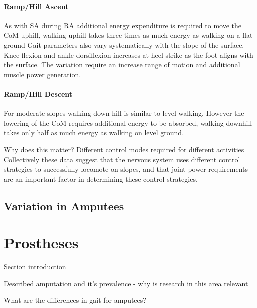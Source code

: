 \paragraph{Ramp/Hill Ascent}
As with SA during RA additional energy expenditure is required to move the CoM uphill\cite{Franz2012a}, walking uphill takes three times as much energy as walking on a flat ground\cite{Matsumoto2017} Gait parameters also vary systematically with the slope of the surface\cite{Kimel-Naor2017}. Knee flexion and ankle dorsiflexion increases at heel strike as the foot aligns with the surface. The variation require an increase range of motion and additional muscle power generation.\cite{McIntosh2006}

\paragraph{Ramp/Hill Descent}
For moderate slopes walking down hill is similar to level walking. However the lowering of the CoM requires additional energy to be absorbed\cite{Franz2012a}, walking downhill takes only half as much energy as walking on level ground\cite{Matsumoto2017}.

Why does this matter? Different control modes required for different activities
Collectively these data suggest that the nervous system uses different control strategies to successfully locomote on slopes, and that joint power requirements are an important factor in determining these control strategies.\cite{Lay2007}

\subsection{Variation in Amputees}


\section{Prostheses}
Section introduction

Described amputation and it's prevalence - why is research in this area relevant 

What are the differences in gait for amputees? 

